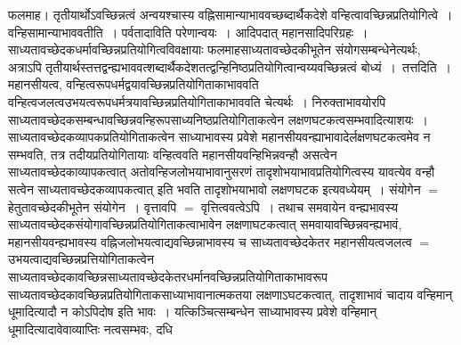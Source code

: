 \documentclass[10pt, openany]{book}
\begin{document}
{फलमाह। तृतीयार्थोऽवच्छिन्नत्वं अन्वयश्चास्य वह्निसामान्याभाववच्छब्दार्थैकदेशे वन्हित्वावच्छिन्नप्रतियोगित्वे~।{\qt वन्हिसामान्याभाववतीति}~। पर्वतादाविति परेणान्वयः~। आदिपदात् महानसादिपरिग्रहः~। साध्यतावच्छेदकधर्मावच्छिन्नप्रतियोगित्वविवक्षायाः फलमाहसाध्यतावच्छेदकीभूतेन संयोगसम्बन्धेनेत्यर्थः, अत्राऽपि
तृतीयार्थस्तत्तद्वन्ह्यभाववत्शब्दार्थैकदेशतत्द्वन्हिनिष्ठप्रतियोगित्वान्वय्यवच्छिन्नत्वं बोध्यं~।~{\la तत्तदिति~।} महानसीयत्व, वन्हित्वरूपधर्मद्वयावच्छिन्नप्रतियोगिताकाभाववति वन्हित्वजलत्वउभयत्वरूपधर्मत्रयावच्छिन्नप्रतियोगिताकाभाववति चेत्यर्थः~। निरुक्ताभावयोरपि साध्यतावच्छेदकसम्बन्धावच्छिन्नवन्हिरूपसाध्यनिष्ठप्रतियोगिताकत्वेन
लक्षणघटकत्वसम्भवादित्याशयः~। साध्यतावच्छेदकव्यापकप्रतियोगिताकत्वेन साध्याभावस्य प्रवेशे महानसीयवन्ह्याभावादेर्लक्षणघटकत्वमेव न सम्भवति, तत्र
तदीयप्रतियोगितायाः वन्हित्ववति महानसीयवन्हिभिन्नवन्हौ असत्वेन साध्यतावच्छेदकाव्यापकत्वात् अतोवन्हिजलोभयाभावानुसरणं तादृशोभयाभावप्रतियोगित्वस्य
यावत्येव वन्हौ सत्वेन साध्यतावच्छेदकव्यापकत्वात् इति भवति तादृशोभयाभावो लक्षणघटक इत्यवध्येयम्~। संयोगेन $=$ हेतुतावच्छेदकीभूतेन संयोगेन~। वृत्तावपि $=$ वृत्तित्ववत्वेऽपि~। तथाच समवायेन वन्ह्यभावस्य साध्यतावच्छेदकसंयोगावच्छिन्नप्रतियोगिताकत्वाभावेन लक्षणाघटकत्वात् समवायावच्छिन्नवन्ह्यभावं, महानसीयवन्ह्यभावस्य वह्निजलोभयत्वाद्यवच्छिन्नाभावस्य च साध्यतावच्छेदकेतर महानसीयत्वजलत्व $=$ उभयत्वाद्यवच्छिन्नप्रत्तियोगिताकत्वेन साध्यतावच्छेदकावच्छिन्नसाध्यतावच्छेदकेतरधर्मानवच्छिन्नप्रतियोगिताकाभावरूप साध्यतावच्छेदकावच्छिन्नप्रतियोगिताकसाध्याभावानात्मकतया लक्षणाऽघटकत्वात्, तादृशाभावं चादाय वन्हिमान् धूमादित्यादौ न कोऽपिदोष इति भावः~। यत्किञ्चित्सम्बन्धेन साध्याभावस्य प्रवेशे वन्हिमान् धूमादित्यादावेवाव्याप्तिः नत्वसम्भवः, दधि

}
\end{document}
